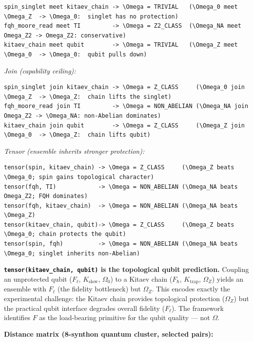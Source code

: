 \documentclass[12pt,a4paper]{article}
\begin{document}
\begin{lstlisting}
spin_singlet meet kitaev_chain -> \Omega = TRIVIAL   (\Omega_0 meet \Omega_Z  -> \Omega_0:  singlet has no protection)
fqh_moore_read meet TI         -> \Omega = Z2_CLASS  (\Omega_NA meet Omega_Z2 -> Omega_Z2: conservative)
kitaev_chain meet qubit        -> \Omega = TRIVIAL   (\Omega_Z meet \Omega_0  -> \Omega_0:  qubit pulls down)
\end{lstlisting}

\emph{Join (capability ceiling):}

\begin{lstlisting}
spin_singlet join kitaev_chain -> \Omega = Z_CLASS     (\Omega_0 join \Omega_Z  -> \Omega_Z:  chain lifts the singlet)
fqh_moore_read join TI         -> \Omega = NON_ABELIAN (\Omega_NA join Omega_Z2 -> \Omega_NA: non-Abelian dominates)
kitaev_chain join qubit        -> \Omega = Z_CLASS     (\Omega_Z join \Omega_0  -> \Omega_Z:  chain lifts qubit)
\end{lstlisting}

\emph{Tensor (ensemble inherits stronger protection):}

\begin{lstlisting}
tensor(spin, kitaev_chain) -> \Omega = Z_CLASS     (\Omega_Z beats \Omega_0; spin gains topological character)
tensor(fqh, TI)            -> \Omega = NON_ABELIAN (\Omega_NA beats Omega_Z2; FQH dominates)
tensor(fqh, kitaev_chain)  -> \Omega = NON_ABELIAN (\Omega_NA beats \Omega_Z)
tensor(kitaev_chain, qubit)-> \Omega = Z_CLASS     (\Omega_Z beats \Omega_0; chain protects the qubit)
tensor(spin, fqh)          -> \Omega = NON_ABELIAN (\Omega_NA beats \Omega_0; singlet inherits non-Abelian)
\end{lstlisting}

\textbf{\texttt{tensor(kitaev\_chain, qubit)} is the topological qubit prediction.} Coupling an unprotected qubit ($F_{\ell}$, $K_{\text{slow}}$, $\Omega_0$) to a Kitaev chain ($F_{\hbar}$, $K_{\text{trap}}$, $\Omega_Z$) yields an ensemble with $F_{\ell}$ (the fidelity bottleneck) but $\Omega_Z$. This encodes exactly the experimental challenge: the Kitaev chain provides topological protection ($\Omega_Z$) but the practical qubit interface degrades overall fidelity ($F_{\ell}$). The framework identifies $F$ as the load-bearing primitive for the qubit quality --- not $\Omega$.

\textbf{Distance matrix (8-synthon quantum cluster, selected pairs):}
\end{document}
